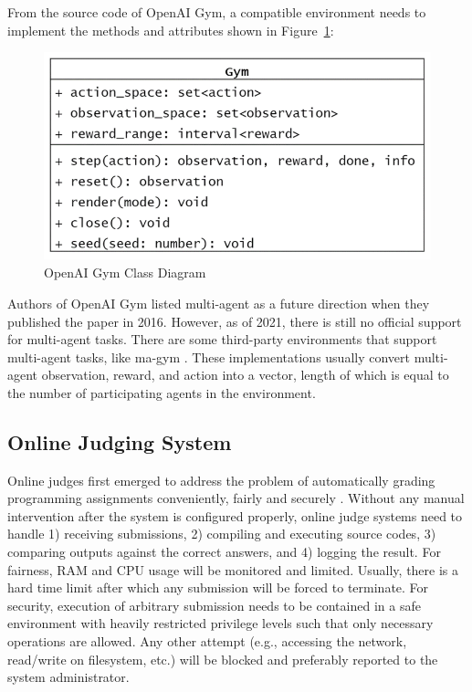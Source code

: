 From the source code of OpenAI Gym, a compatible environment needs to implement the methods and attributes shown in Figure~\ref{fig:gym-class}:

\begin{figure}[H]
    \centering
    \includegraphics{images/gym-class.png}
    \caption{OpenAI Gym Class Diagram}
    \label{fig:gym-class}
\end{figure}

Authors of OpenAI Gym listed multi-agent as a future direction when they published the paper in 2016. However, as of 2021, there is still no official support for multi-agent tasks. There are some third-party environments that support multi-agent tasks, like ma-gym \parencite{magym}. These implementations usually convert multi-agent observation, reward, and action into a vector, length of which is equal to the number of participating agents in the environment.

\subsection{Online Judging System}
Online judges first emerged to address the problem of automatically grading programming assignments conveniently, fairly and securely \parencite{RN4}. Without any manual intervention after the system is configured properly, online judge systems need to handle 1) receiving submissions, 2) compiling and executing source codes, 3) comparing outputs against the correct answers, and 4) logging the result. For fairness, RAM and CPU usage will be monitored and limited. Usually, there is a hard time limit after which any submission will be forced to terminate. For security, execution of arbitrary submission needs to be contained in a safe environment with heavily restricted privilege levels such that only necessary operations are allowed. Any other attempt (e.g., accessing the network, read/write on filesystem, etc.) will be blocked and preferably reported to the system administrator. 


